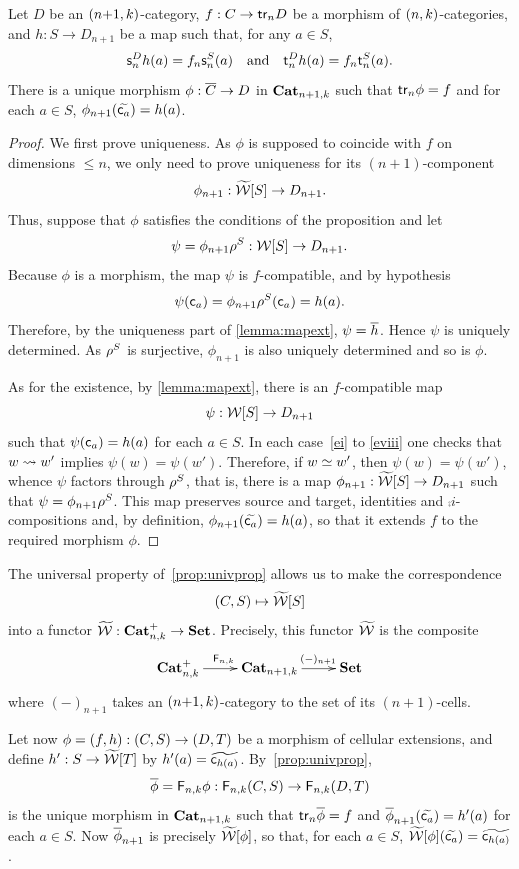 \begin{proposition}\label{prop:univprop}
   Let $D$ be an  $(n{+}1,k)$-category, $f:C\to\mathsf{tr}_{n} D$ be a
   morphism of $(n,k)$-categories,
   and  $h:S\to D_{n+1}$ be a map such that, for any $a\in S$,
   \[
     \mathsf{s}_{n}^Dh(a)=f_n\mathsf{s}_{n}^S (a)
     \quad\text{and}\quad \mathsf{t}_{n}^D h(a)=f_n\mathsf{t}_{n}^S (a).
     \]
   There is a unique
    morphism $\phi:\overline{C}\to D$ in $\mathbf{Cat}_{n+1,k}$ such that $\mathsf{tr}_{n}\phi=f$ and for each $a\in S$, $\phi_{n+1}(\widetilde{\mathsf{c}_{a}})=h(a)$.
  \end{proposition}
  \begin{proof}
We first prove uniqueness. As $\phi$ is supposed to coincide with $f$ on
dimensions $\leq n$, we only need to prove uniqueness for its
$(n{+}1)$-component
\[\phi_{n+1}:\widetilde{\mathcal{W}}[S]\to D_{n+1}.\]
 Thus, suppose
that $\phi$ satisfies the conditions of the proposition and let
\[\psi=\phi_{n+1} \rho^{S}:\mathcal{W}[S]\to D_{n+1}.\]
   Because $\phi$ is a morphism, the  map $\psi$ is
   $f$-compatible, and by hypothesis \[\psi(\mathsf{c}_{a})=\phi_{n+1}\rho^{S}(\mathsf{c}_{a})=h(a).\] Therefore, by the uniqueness
   part of
   \cref{lemma:mapext}, $\psi=\overline{h}$. Hence $\psi$ is uniquely determined.
As $\rho^{S}$  is surjective,
  $\phi_{n+1}$ is also uniquely determined and so is $\phi$.

  As for the existence, by \cref{lemma:mapext}, there is an
  $f$-compatible map
  \[\psi:\mathcal{W}[S]\to D_{n+1}\]
  such that $\psi(\mathsf{c}_{a})=h(a)$ for each $a\in S$. 
  In each case~\ref{ei} to \ref{eviii} one checks that $w\leadsto w'$
  implies $\psi(w)=\psi(w')$. Therefore, if $w\simeq w'$, then
  $\psi(w)=\psi(w')$, whence $\psi$ factors through $\rho^{S}$, that
  is, there is a map $\phi_{n+1}:\widetilde{\mathcal{W}}[S]\to D_{n+1}$ such that
  $\psi=\phi_{n+1}\rho^{S}$. This map preserves source and target,
  identities and $\comp i$-compositions and, by definition, $\phi_{n+1}(\widetilde{\mathsf{c}_{a}})=h(a)$, so that it extends $f$ to the required morphism $\phi$. 
\end{proof}
\begin{remark}\label{rmk:functoriality_of_wtxeq}
  The universal property of~\cref{prop:univprop} allows us to make the correspondence
  \[(C,S)\mapsto \widetilde{\mathcal{W}}[S]\]
  into a functor $\widetilde{\mathcal{W}}:\mathbf{Cat}_{n,k}^{+}\to\mathbf{Set}$. Precisely, this functor $\widetilde{\mathcal{W}}$ is the composite
  \[
    \xymatrix{\npCatp nk\ar[r]^{\frf{n,k}} & \npCat{n+1}k \ar[r]^(.6){(-)_{n+1}}& \Set}
  \]
  where $(-)_{n+1}$ takes an $(n{+}1,k)$-category to the set of
  its $(n{+}1)$-cells.

  Let now $\phi=(f,h):(C,S)\to (D,T)$
  be a morphism of cellular extensions, and define $h':S\to\widetilde{\mathcal{W}}[T]$
  by $h'(a)=\widetilde{\mathsf{c}_{h(a)}}$. By~\cref{prop:univprop},
  \[\overline{\phi}=\mathsf{F}_{n,k}\phi:\mathsf{F}_{n,k}(C,S)\to\mathsf{F}_{n,k}(D,T)\] is
  the unique morphism in $\mathbf{Cat}_{n+1,k}$ such that $\mathsf{tr}_{n}\overline{\phi}=f$ and $\overline{\phi}_{n+1}(\widetilde{\mathsf{c}_{a}})=h'(a)$ for
  each $a\in S$. Now
  $\overline{\phi}_{n+1}$ is precisely $\widetilde{\mathcal{W}}[\phi]$, so that, for each $a\in
  S$, $\widetilde{\mathcal{W}}[\phi](\widetilde{\mathsf{c}_{a}})=\widetilde{\mathsf{c}_{h(a)}}$.
\end{remark}

